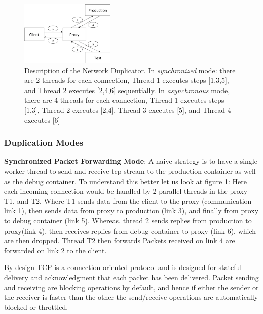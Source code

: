 \begin{figure}[ht!]
  \begin{centering}
    \includegraphics[width=0.4\textwidth]{figs/network_dup.eps}
    \caption{Description of the Network Duplicator. In \textit{synchronized} mode: there are 2 threads for each connection, Thread 1 executes steps [1,3,5], and Thread 2 executes [2,4,6] sequentially. In \textit{asynchronous} mode, there are 4 threads for each connection, Thread 1 executes steps [1,3], Thread 2 executes [2,4], Thread 3 executes [5], and Thread 4 executes [6]}
    \label{fig:duplicator}
  \end{centering}
\end{figure}


\subsubsection{Duplication Modes}
\label{sec:dupMode}


\noindent
\textbf{Synchronized Packet Forwarding Mode}: 
A naive strategy is to have a single worker thread to send and receive tcp stream to the production container as well as the debug container.
To understand this better let us look at figure \ref{fig:duplicator}: Here each incoming connection would be handled by 2 parallel threads in the proxy T1, and T2. 
Where T1 sends data from the client to the proxy (communication link 1), then sends data from proxy to production (link 3), and finally from proxy to debug container (link 5). 
Whereas, thread 2 sends replies from production to proxy(link 4), then receives replies from debug container to proxy (link 6), which are then dropped. 
Thread T2 then forwards Packets received on link 4 are forwarded on link 2 to the client.

By design TCP is a connection oriented protocol and is designed for stateful delivery and acknowledgment that each packet has been delivered.
Packet sending and receiving are blocking operations by default, and hence if either the sender or the receiver is faster than the other the send/receive operations are automatically blocked or throttled.

